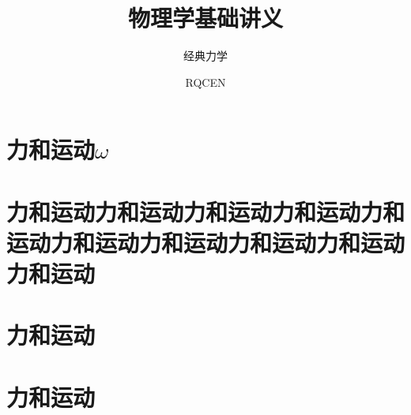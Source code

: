 \documentclass[color=red,openany]{textbook-cn}%
\title{物理学基础讲义}
\subtitle{经典力学}
\author{RQCEN}
\begin{document}
\MainFont

\makecover
\maketitle

\frontmatter
\part{力和运动$\omega$}
\part{力和运动力和运动力和运动力和运动力和运动力和运动力和运动力和运动力和运动力和运动}



\tableofcontents
%
\mainmatter

\part{力和运动}
\part*{力和运动}

%
%
%
%
%
%
%
%
%
%
%
%
%
%
%
%
%
%


\backmatter

%	



\end{document}
